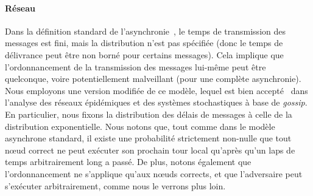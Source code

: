 \documentclass[a4,twocolumn,10pt]{article}
\theoremstyle{definition}
\begin{document}
\paragraph{Réseau} 
Dans la définition standard de l'asynchronie~\cite{ben1983another}, le temps de transmission des messages est fini, mais la distribution n'est pas spécifiée (donc le temps de délivrance peut être non borné pour certains messages). Cela implique que l'ordonnancement de la transmission des messages lui-même peut être quelconque, voire potentiellement malveillant (pour une complète asynchronie).
Nous employons une version mo\-difiée de ce modèle, lequel est bien accepté~\cite{banerjee2014epidemic, ganesh2005effect, draief2006thresholds, keeling2011modeling, liggett1997stochastic} dans l'analyse des réseaux épidémiques et des systèmes stochastiques à base de \emph{gossip}. En particulier, nous fixons la distribution des délais de messages à celle de la distribution exponentielle.
Nous notons que, tout comme dans le modèle asynchrone standard, il existe une probabilité strictement non-nulle que tout nœud correct ne peut exécuter son prochain tour local qu'après qu'un laps de temps arbitrairement long a passé.
De plus, notons également que l'ordonnancement ne s'applique qu'aux nœuds corrects, et que l'adversaire peut s'exécuter arbitrairement, comme nous le verrons plus loin.
\end{document}
